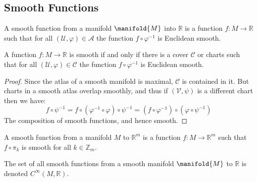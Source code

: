 \documentclass{article}                                                        %
\begin{document}
        \subsection{Smooth Functions}
            \begin{definition}
                A smooth function from a manifold $\manifold{M}$ into
                $\mathbb{R}$ is a function $f:M\rightarrow\mathbb{R}$ such that
                for all $(\mathcal{U},\varphi)\in\mathcal{A}$ the function
                $f\circ\varphi^{\minus{1}}$ is Euclidean smooth.
            \end{definition}
            \begin{theorem}
                A function $f:M\rightarrow\mathbb{R}$ is smooth if and only if
                there is a cover $\mathcal{C}$ or charts such that for all
                $(\mathcal{U},\varphi)\in\mathcal{C}$ the function
                $f\circ\varphi^{\minus{1}}$ is Euclidean smooth.
            \end{theorem}
            \begin{proof}
                Since the atlas of a smooth manifold is maximal, $\mathcal{C}$
                is contained in it. But charts in a smooth atlas overlap
                smoothly, and thus if $(\mathcal{V},\psi)$ is a different chart
                then we have:
                \begin{equation}
                    f\circ\psi^{\minus{1}}
                        =f\circ(\varphi^{\minus{1}}\circ\varphi)
                            \circ\psi^{\minus{1}}
                        =(f\circ\varphi^{\minus{1}})
                            \circ(\varphi\circ\psi^{\minus{1}})
                \end{equation}
                The composition of smooth functions, and hence smooth.
            \end{proof}
            \begin{definition}
                A smooth function from a manifold $M$ to $\mathbb{R}^{m}$ is a
                function $f:M\rightarrow\mathbb{R}^{m}$ such that
                $f\circ\pi_{k}$ is smooth for all $k\in\mathbb{Z}_{m}$.
            \end{definition}
            \begin{definition}
                The set of all smooth functions from a smooth manifold
                $\manifold{M}$ to $\mathbb{R}$ is denoted
                $C^{\infty}(M,\mathbb{R})$.
            \end{definition}
\end{document}
